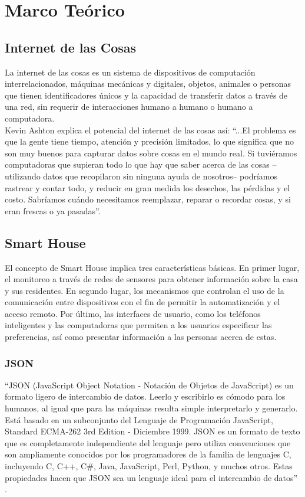 \section{Marco Teórico}

\subsection{Internet de las Cosas}

La internet de las cosas es un sistema de dispositivos de computación interrelacionados, máquinas mecánicas y digitales, objetos, animales o personas que tienen identificadores únicos y la capacidad de transferir datos a través de una red, sin requerir de interacciones humano a humano o humano a computadora. \\

Kevin Ashton explica el potencial del internet de las cosas así: ``...El problema es que la gente tiene tiempo, atención y precisión limitados, lo que significa que no son muy buenos para capturar datos sobre cosas en el mundo real. Si tuviéramos computadoras que supieran todo lo que hay que saber acerca de las cosas –utilizando datos que recopilaron sin ninguna ayuda de nosotros– podríamos rastrear y contar todo, y reducir en gran medida los desechos, las pérdidas y el costo. Sabríamos cuándo necesitamos reemplazar, reparar o recordar cosas, y si eran frescas o ya pasadas”. \cite{Asthon2009} 

\subsection{Smart House}

El concepto de Smart House implica tres características básicas. En primer lugar, el monitoreo a través de redes de sensores para obtener información sobre la casa y sus residentes. En segundo lugar, los mecanismos que controlan el uso de la comunicación entre dispositivos con el fin de permitir la automatización y el acceso remoto. Por último, las interfaces de usuario, como los teléfonos inteligentes y las computadoras que permiten a los usuarios especificar las preferencias, así como presentar información a las personas acerca de estas. \\

\subsubsection{JSON}

``JSON (JavaScript Object Notation - Notación de Objetos de JavaScript) es un formato ligero de intercambio de datos. Leerlo y escribirlo es cómodo para los humanos, al igual que para las máquinas resulta simple interpretarlo y generarlo. Está basado en un subconjunto del Lenguaje de Programación JavaScript, Standard ECMA-262 3rd Edition - Diciembre 1999. JSON es un formato de texto que es completamente independiente del lenguaje pero utiliza convenciones que son ampliamente conocidos por los programadores de la familia de lenguajes C, incluyendo C, C++, C\#, Java, JavaScript, Perl, Python, y muchos otros. Estas propiedades hacen que JSON sea un lenguaje ideal para el intercambio de datos'' \cite{JSON}.

